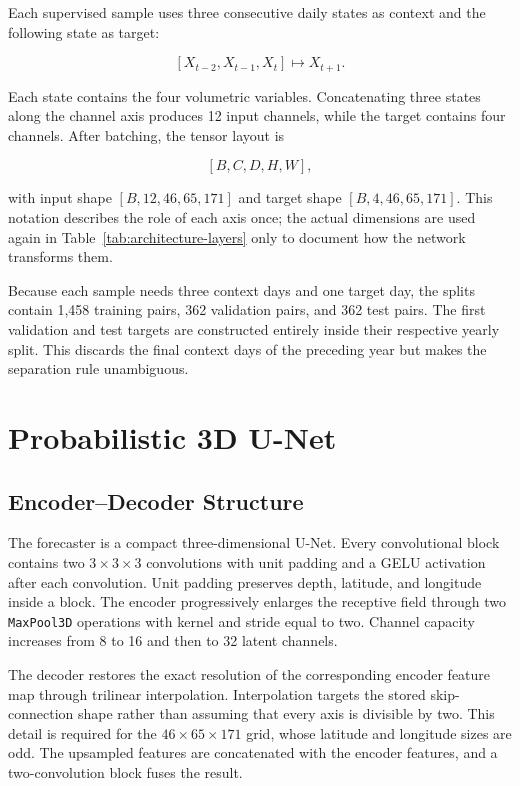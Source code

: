 Each supervised sample uses three consecutive daily states as context and the following state as target:

\[
[X_{t-2},X_{t-1},X_t] \longmapsto X_{t+1}.
\]

Each state contains the four volumetric variables. Concatenating three states along the channel axis produces 12 input channels, while the target contains four channels. After batching, the tensor layout is

\[
[B,C,D,H,W],
\]

with input shape $[B,12,46,65,171]$ and target shape $[B,4,46,65,171]$. This notation describes the role of each axis once; the actual dimensions are used again in Table~\ref{tab:architecture-layers} only to document how the network transforms them.

Because each sample needs three context days and one target day, the splits contain 1,458 training pairs, 362 validation pairs, and 362 test pairs. The first validation and test targets are constructed entirely inside their respective yearly split. This discards the final context days of the preceding year but makes the separation rule unambiguous.

\section{Probabilistic 3D U-Net}

\subsection{Encoder--Decoder Structure}

The forecaster is a compact three-dimensional U-Net. Every convolutional block contains two $3\times3\times3$ convolutions with unit padding and a GELU activation after each convolution. Unit padding preserves depth, latitude, and longitude inside a block. The encoder progressively enlarges the receptive field through two \texttt{MaxPool3D} operations with kernel and stride equal to two. Channel capacity increases from 8 to 16 and then to 32 latent channels.

The decoder restores the exact resolution of the corresponding encoder feature map through trilinear interpolation. Interpolation targets the stored skip-connection shape rather than assuming that every axis is divisible by two. This detail is required for the $46\times65\times171$ grid, whose latitude and longitude sizes are odd. The upsampled features are concatenated with the encoder features, and a two-convolution block fuses the result.

